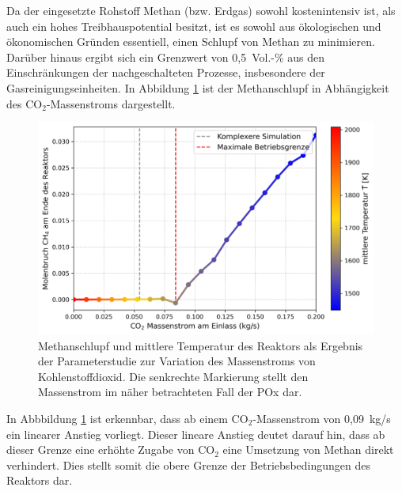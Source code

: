 
        Da der eingesetzte Rohstoff Methan (bzw. Erdgas) sowohl kostenintensiv ist, als auch ein hohes Treibhauspotential besitzt, ist es sowohl aus ökologischen und ökonomischen Gründen essentiell, einen Schlupf von Methan zu minimieren. Darüber hinaus ergibt sich ein Grenzwert von 0,5~Vol.-\% aus den Einschränkungen der nachgeschalteten Prozesse, insbesondere der Gasreinigungseinheiten. In Abbildung \ref{fig:auswertung_co2_methanschupf} ist der Methanschlupf in Abhängigkeit des CO$_2$-Massenstroms dargestellt. 
        \begin{figure}[H]
            \centering
            \includegraphics[width=0.75\linewidth]{img/Parameterstudie_CO2/Parameterstudie_CO2_CH4_Schlupf_colormap_marker.png}
            \caption{Methanschlupf und mittlere Temperatur des Reaktors als Ergebnis der Parameterstudie zur Variation des Massenstroms von Kohlenstoffdioxid. Die senkrechte Markierung stellt den Massenstrom im näher betrachteten Fall der POx dar.}
            \label{fig:auswertung_co2_methanschupf}
        \end{figure}
        In Abbbildung \ref{fig:auswertung_co2_methanschupf} ist erkennbar, dass ab einem CO$_2$-Massenstrom von 0,09~kg/s ein linearer Anstieg vorliegt. Dieser lineare Anstieg deutet darauf hin, dass ab dieser Grenze eine erhöhte Zugabe von CO$_2$ eine Umsetzung von Methan direkt verhindert. Dies stellt somit die obere Grenze der Betriebsbedingungen des Reaktors dar. 


